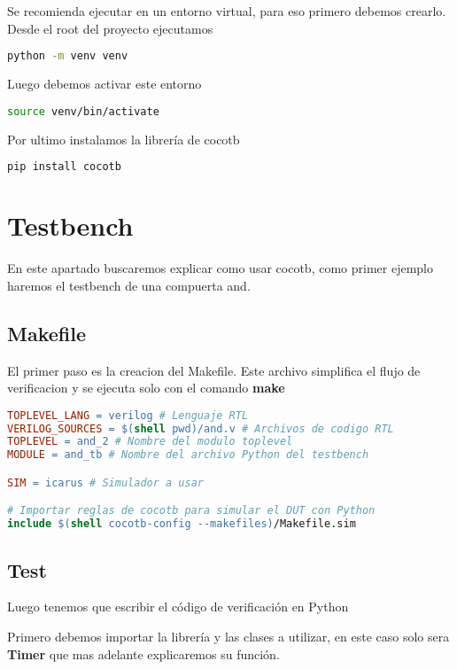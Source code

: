 \documentclass[a4paper,12pt]{article}
\begin{document}
Se recomienda ejecutar en un entorno virtual, para eso primero debemos crearlo. Desde el root del proyecto ejecutamos
\begin{lstlisting}[language=bash]
python -m venv venv
\end{lstlisting}

Luego debemos activar este entorno
\begin{lstlisting}[language=bash]
source venv/bin/activate
\end{lstlisting}

Por ultimo instalamos la librería de cocotb
\begin{lstlisting}[language=bash]
pip install cocotb
\end{lstlisting}

\newpage

\section{Testbench}
En este apartado buscaremos explicar como usar cocotb, como primer ejemplo haremos el testbench de una compuerta and.

\subsection{Makefile}

El primer paso es la creacion del Makefile. Este archivo simplifica el flujo de verificacion y se ejecuta solo con el comando \textbf{make}

\begin{lstlisting}[language=make, caption=Makefile, frame=lines]
TOPLEVEL_LANG = verilog # Lenguaje RTL
VERILOG_SOURCES = $(shell pwd)/and.v # Archivos de codigo RTL
TOPLEVEL = and_2 # Nombre del modulo toplevel
MODULE = and_tb # Nombre del archivo Python del testbench

SIM = icarus # Simulador a usar

# Importar reglas de cocotb para simular el DUT con Python
include $(shell cocotb-config --makefiles)/Makefile.sim
\end{lstlisting}


\subsection{Test}

Luego tenemos que escribir el código de verificación en Python

Primero debemos importar la librería y las clases a utilizar, en este caso solo sera \textbf{Timer} que mas adelante explicaremos su función.
\end{document}
